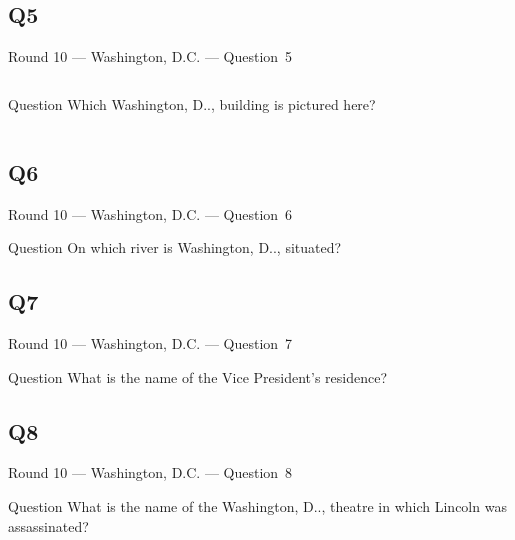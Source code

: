 \documentclass[11pt]{beamer}
\begin{document}
\subsection*{Q5}
\begin{frame}[t]{Round 10 --- Washington, D.C. --- \mbox{Question 5}}
    \vspace{-0.5em}
    \begin{columns}[T,totalwidth=\linewidth]
        \begin{column}{0.32\linewidth}
            \begin{block}{Question}
                Which Washington, D.\@C.\@, building is pictured here?
            \end{block}
        \end{column}
        \begin{column}{0.65\linewidth}
            \begin{center}
                \texttt{[image: \{Images/libraryofcongress]}.jpg}
            \end{center}
        \end{column}
    \end{columns}
\end{frame}
\subsection*{Q6}
\begin{frame}[t]{Round 10 --- Washington, D.C. --- \mbox{Question 6}}
    \vspace{-0.5em}
    \begin{block}{Question}
        On which river is Washington, D.\@C.\@, situated?
    \end{block}
\end{frame}
\subsection*{Q7}
\begin{frame}[t]{Round 10 --- Washington, D.C. --- \mbox{Question 7}}
    \vspace{-0.5em}
    \begin{block}{Question}
        What is the name of the Vice President's residence?
    \end{block}
\end{frame}
\subsection*{Q8}
\begin{frame}[t]{Round 10 --- Washington, D.C. --- \mbox{Question 8}}
    \vspace{-0.5em}
    \begin{block}{Question}
        What is the name of the Washington, D.\@C.\@, theatre in which Lincoln was assassinated?
    \end{block}
\end{frame}
\end{document}
